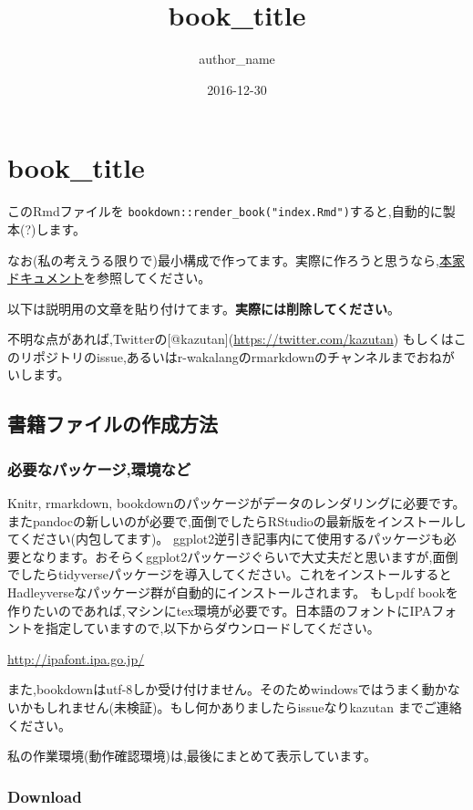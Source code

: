 \documentclass[]{book}
\title{book\_title}
\author{author\_name}
\date{2016-12-30}
\begin{document}
\maketitle

{
\setcounter{tocdepth}{1}
\tableofcontents
}
\chapter{book\_title}\label{book_title}

このRmdファイルを
\texttt{bookdown::render\_book("index.Rmd")}すると,自動的に製本(?)します。

なお(私の考えうる限りで)最小構成で作ってます。実際に作ろうと思うなら,\href{https://bookdown.org/yihui/bookdown/}{本家ドキュメント}を参照してください。

以下は説明用の文章を貼り付けてます。\textbf{実際には削除してください}。

不明な点があれば,Twitterの{[}@kazutan{]}(\url{https://twitter.com/kazutan})
もしくはこのリポジトリのissue,あるいはr-wakalangのrmarkdownのチャンネルまでおねがいします。

\section{書籍ファイルの作成方法}

\subsection{必要なパッケージ,環境など}

Knitr, rmarkdown,
bookdownのパッケージがデータのレンダリングに必要です。またpandocの新しいのが必要で,面倒でしたらRStudioの最新版をインストールしてください(内包してます)。
ggplot2逆引き記事内にて使用するパッケージも必要となります。おそらくggplot2パッケージぐらいで大丈夫だと思いますが,面倒でしたらtidyverseパッケージを導入してください。これをインストールするとHadleyverseなパッケージ群が自動的にインストールされます。
もしpdf
bookを作りたいのであれば,マシンにtex環境が必要です。日本語のフォントにIPAフォントを指定していますので,以下からダウンロードしてください。

\url{http://ipafont.ipa.go.jp/}

また,bookdownはutf-8しか受け付けません。そのためwindowsではうまく動かないかもしれません(未検証)。もし何かありましたらissueなりkazutan
までご連絡ください。

私の作業環境(動作確認環境)は,最後にまとめて表示しています。

\subsection{Download}\label{download}
\end{document}
